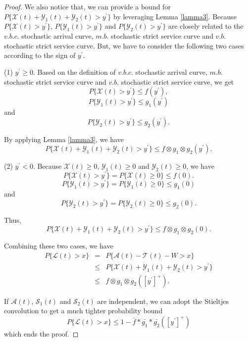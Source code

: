 \documentclass[12pt]{article}
\newtheorem{proof}{Proof}
\def \QED {\hfill \vrule height6pt width 6pt depth 0pt}
\begin{document}
\begin{proof}
We also notice that, we can provide a bound for $P\{\mathcal{X}(t)+\mathcal{Y}_1(t)+\mathcal{Y}_2(t)>y^\prime\}$ by leveraging Lemma \ref{lamma3}. Because $P\{\mathcal{X}(t)>y^\prime\}$, $P\{\mathcal{Y}_1(t)>y^\prime\}$ and $P\{\mathcal{Y}_2(t)>y^\prime\}$ are closely related to the $v.b.c.$ stochastic arrival curve, $m.b.$ stochastic strict service curve and $v.b.$ stochastic strict service curve. But, we have to consider the following two cases according to the sign of $y^\prime$.

(1) $y^\prime\geq 0$. Based on the definition of $v.b.c.$ stochastic arrival curve, $m.b.$ stochastic strict service curve and $v.b.$ stochastic strict service curve, we get
$$P\{\mathcal{X}(t)>y^\prime\}\leq f(y^\prime),$$
$$P\{\mathcal{Y}_1(t)>y^\prime\}\leq g_1(y^\prime)$$
and
$$P\{\mathcal{Y}_2(t)>y^\prime\}\leq g_2(y^\prime).$$

By applying Lemma \ref{lamma3}, we have
\begin{equation}\label{equation1}
P\{\mathcal{X}(t)+\mathcal{Y}_1(t)+\mathcal{Y}_2(t)>y^\prime\}\leq f\otimes g_1\otimes g_2(y^\prime).
\end{equation}

(2) $y^\prime<0$. Because $\mathcal{X}(t)\geq 0$, $\mathcal{Y}_1(t)\geq 0$ and $\mathcal{Y}_2(t)\geq 0$, we have
$$P\{\mathcal{X}(t)>y^\prime\}=P\{\mathcal{X}(t)\geq 0\}\leq f(0).$$
$$P\{\mathcal{Y}_1(t)>y^\prime\}=P\{\mathcal{Y}_1(t)\geq 0\}\leq g_1(0)$$
and
$$P\{\mathcal{Y}_2(t)>y^\prime\}=P\{\mathcal{Y}_2(t)\geq 0\}\leq g_2(0).$$

Thus,
\begin{equation}\label{equation2}
P\{\mathcal{X}(t)+\mathcal{Y}_1(t)+\mathcal{Y}_2(t)>y^\prime\}\leq f\otimes g_1\otimes g_2(0).
\end{equation}

Combining these two cases, we have
\begin{eqnarray*}
  P\{\mathcal{L}(t)>x\}&=&P\{\mathcal{A}(t)-\mathcal{T}(t)-W>x\}\\
  &\leq&P\{\mathcal{X}(t)+\mathcal{Y}_1(t)+\mathcal{Y}_2(t)>y^\prime\}\\
  &\leq& f\otimes g_1\otimes g_2([y^\prime]^+).
\end{eqnarray*}

If $\mathcal{A}(t)$, $\mathcal{S}_1(t)$ and $\mathcal{S}_2(t)$ are independent, we can adopt the Stieltjes convolution to get a much tighter probability bound
$$P\{\mathcal{L}(t)>x\}\leq 1-\bar{f}\ast\bar{g_1}\ast\bar{g_2}([y^\prime]^+)$$
which ends the proof.\QED
\end{proof}
\end{document}
